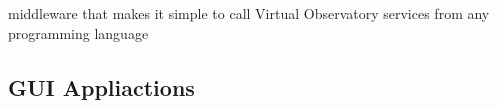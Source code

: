 middleware that makes it simple to call Virtual Observatory services
from any programming language
\subsection{GUI Appliactions}













